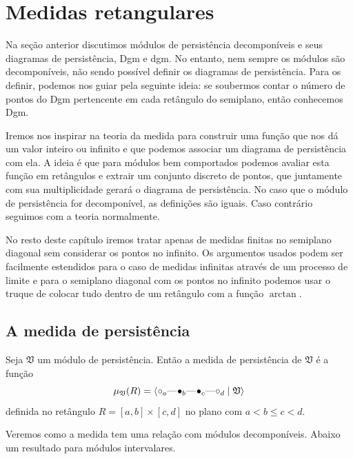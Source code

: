 \section{Medidas retangulares}
Na seção anterior discutimos módulos de persistência decomponíveis e seus diagramas de persistência,
Dgm e dgm. No entanto, nem sempre os módulos são decomponíveis, não sendo possível definir os 
diagramas de persistência. Para os definir, podemos nos guiar pela seguinte ideia: se soubermos 
contar o número de pontos do Dgm pertencente em cada retângulo do semiplano, então conhecemos Dgm.

Iremos nos inspirar na teoria da medida para construir uma função que nos dá um valor inteiro ou 
infinito e que podemos associar um diagrama de persistência com ela. A ideia é que para módulos 
bem comportados podemos avaliar esta função em retângulos e extrair um conjunto discreto de pontos,
que juntamente com sua multiplicidade gerará o diagrama de persistência. No caso que o módulo de 
persistência for decomponível, as definições são iguais. Caso contrário seguimos com a teoria 
normalmente. 

No resto deste capítulo iremos tratar apenas de medidas finitas no semiplano diagonal sem considerar
os pontos no infinito. Os argumentos usados podem ser facilmente estendidos para o caso de medidas
infinitas através de um processo de limite e para o semiplano diagonal com os pontos no infinito 
podemos usar o truque de colocar tudo dentro de um retângulo com a função $\arctan$.
 
\subsection{A medida de persistência}

\begin{defi} 
    Seja $\mathfrak{V}$ um módulo de persistência. Então a medida de persistência de $\mathfrak{V}$ é a função
    \begin{equation*}
        \mu_{\mathfrak{V}}(R) = \innerproduct{\qoff{a} \qem \qon{b} \qem \qon{c} \qem \qoff{d} \mid \mathfrak{V}}
    \end{equation*}
    definida no retângulo $R = [a,b]\times[c,d]$ no plano com $a < b \leq c < d$. 
\end{defi}

Veremos como a medida tem uma relação com módulos decomponíveis. Abaixo um resultado para módulos intervalares.

